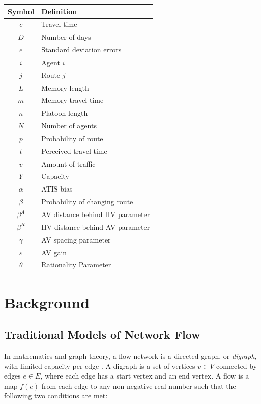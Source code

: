 \documentclass[12pt, a4paper, onecolumn]{article}
\begin{document}
\begin{tabular}{cl}
	Symbol & Definition \\
	\hline
	$c$ & Travel time \\
	$D$ & Number of days \\
	$e$ & Standard deviation errors \\
	$i$ & Agent $i$ \\
	$j$ & Route $j$ \\
	$L$ & Memory length \\
	$m$ & Memory travel time \\
	$n$ & Platoon length \\
	$N$ & Number of agents \\
	$p$ & Probability of route \\
	$t$ & Perceived travel time \\
	$v$ & Amount of traffic \\
	$Y$ & Capacity \\
	$\alpha$ & ATIS bias \\
	$\beta$ & Probability of changing route \\
	$\beta^A$ & AV distance behind HV parameter \\
	$\beta^R$ & HV distance behind AV parameter \\
	$\gamma$ & AV spacing parameter \\
	$\varepsilon$ & AV gain \\
	$\theta$ & Rationality Parameter \\
	\end{tabular}


\pagebreak


\setcounter{page}{1} %

\section{Background}

\subsection{Traditional Models of Network Flow}
In mathematics and graph theory, a flow network is a directed graph, or \textit{digraph}, with limited capacity per edge \citep{Jungnickel2013}. A digraph is a set of vertices $v \in V$ connected by edges $e \in E$, where each edge has a start vertex and an end vertex. A flow is a map $f(e)$ from each edge to any non-negative real number such that the following two conditions are met:
\end{document}
